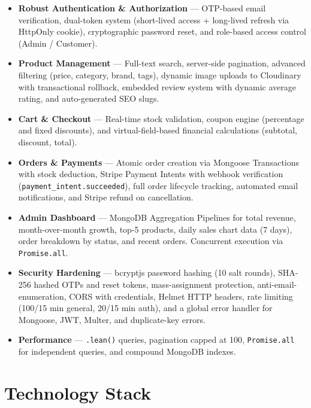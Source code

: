 \begin{itemize}[leftmargin=1.5em]
  \item \textbf{Robust Authentication \& Authorization} --- OTP-based email verification, dual-token system (short-lived access + long-lived refresh via HttpOnly cookie), cryptographic password reset, and role-based access control (Admin / Customer).
  \item \textbf{Product Management} --- Full-text search, server-side pagination, advanced filtering (price, category, brand, tags), dynamic image uploads to Cloudinary with transactional rollback, embedded review system with dynamic average rating, and auto-generated SEO slugs.
  \item \textbf{Cart \& Checkout} --- Real-time stock validation, coupon engine (percentage and fixed discounts), and virtual-field-based financial calculations (subtotal, discount, total).
  \item \textbf{Orders \& Payments} --- Atomic order creation via Mongoose Transactions with stock deduction, Stripe Payment Intents with webhook verification (\texttt{payment\_intent.succeeded}), full order lifecycle tracking, automated email notifications, and Stripe refund on cancellation.
  \item \textbf{Admin Dashboard} --- MongoDB Aggregation Pipelines for total revenue, month-over-month growth, top-5 products, daily sales chart data (7 days), order breakdown by status, and recent orders.  Concurrent execution via \texttt{Promise.all}.
  \item \textbf{Security Hardening} --- bcryptjs password hashing (10 salt rounds), SHA-256 hashed OTPs and reset tokens, mass-assignment protection, anti-email-enumeration, CORS with credentials, Helmet HTTP headers, rate limiting (100/15 min general, 20/15 min auth), and a global error handler for Mongoose, JWT, Multer, and duplicate-key errors.
  \item \textbf{Performance} --- \texttt{.lean()} queries, pagination capped at 100, \texttt{Promise.all} for independent queries, and compound MongoDB indexes.
\end{itemize}

\section{Technology Stack}

